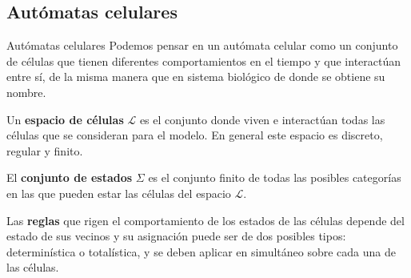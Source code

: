 \documentclass[9pt]{beamer}
\begin{document}
\subsection{Autómatas celulares}
\begin{frame}{Autómatas celulares}
Podemos pensar en un autómata celular como un conjunto de células que tienen diferentes comportamientos en el tiempo y que interactúan entre sí, de la misma manera que en sistema biológico de donde se obtiene su nombre.

Un \textbf{espacio de células} $\mathcal{L}$ es el conjunto donde viven e interactúan todas las células que se consideran para el modelo. En general este espacio es discreto, regular y finito.%

El \textbf{conjunto de estados} $\Sigma$ es el conjunto finito de todas las posibles categorías en las que pueden estar las células del espacio $\mathcal{L}$. %

Las \textbf{reglas} que rigen el comportamiento de los estados de las células depende del estado de sus vecinos y su asignación puede ser de dos posibles tipos: determinística o totalística, y se deben aplicar en simultáneo sobre cada una de las células.
\end{frame}


    
\end{document}
